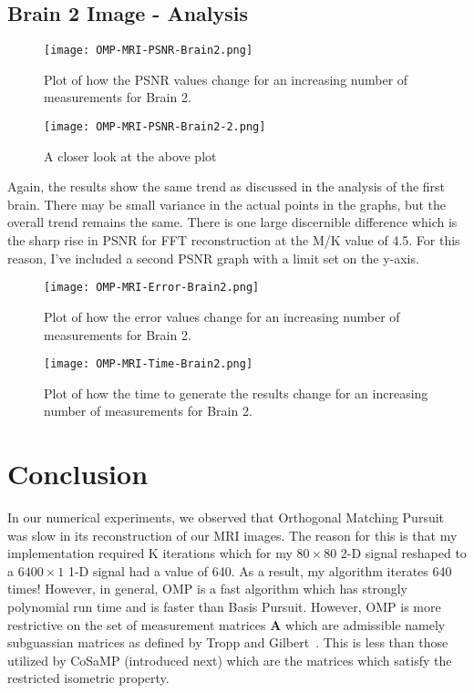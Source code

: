 \documentclass[titlepage,oneside, 12pt]{book}
\theoremstyle{break}
\begin{document}
\subsection{Brain 2 Image - Analysis}

\begin{figure}[H]
\centering
\centerline{\texttt{[image: OMP-MRI-PSNR-Brain2.png]}}
\caption{Plot of how the PSNR values change for an increasing number of measurements for Brain 2.}
\label{fig:OMP-MRI-PSNR-Brain2}
\end{figure}

\begin{figure}[H]
\centering
\centerline{\texttt{[image: OMP-MRI-PSNR-Brain2-2.png]}}
\caption{A closer look at the above plot}
\label{fig:OMP-MRI-PSNR-Brain2-2}
\end{figure}

Again, the results show the same trend as discussed in the analysis of the first brain. There may be small variance in the actual points in the graphs, but the overall trend remains the same. There is one large discernible difference which is the sharp rise in PSNR for FFT reconstruction at the M/K value of 4.5. For this reason, I've included a second PSNR graph with a limit set on the y-axis. 


\begin{figure}[H]
\centering
\centerline{\texttt{[image: OMP-MRI-Error-Brain2.png]}}
\caption{Plot of how the error values change for an increasing number of measurements for Brain 2.}
\label{fig:OMP-MRI-Error-Brain2}
\end{figure}


\begin{figure}[H]
\centering
\centerline{\texttt{[image: OMP-MRI-Time-Brain2.png]}}
\caption{Plot of how the time to generate the results change for an increasing number of measurements for Brain 2.}
\label{fig:OMP-MRI-Time-Brain2}
\end{figure}

\clearpage

\section{Conclusion}

In our numerical experiments, we observed that Orthogonal Matching Pursuit was slow in its reconstruction of our MRI images. The reason for this is that my implementation required K iterations which for my $80 \times 80$ 2-D signal reshaped to a $6400 \times 1$ 1-D signal had a value of 640. As a result, my algorithm iterates 640 times! However, in general, OMP is a fast algorithm which has strongly polynomial run time and is faster than Basis Pursuit. However, OMP is more restrictive on the set of measurement matrices \textbf{A} which are admissible namely subguassian matrices as defined by Tropp and Gilbert~\cite{GP-Orthog}. This is less than those utilized by CoSaMP (introduced next) which are the matrices which satisfy the restricted isometric property.
\end{document}

